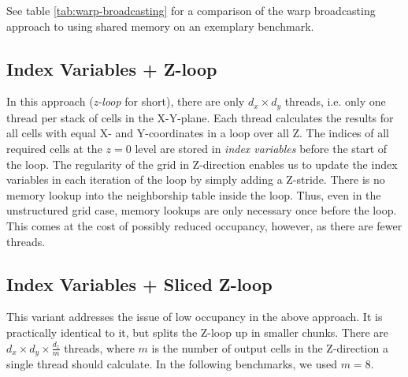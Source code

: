 See table \ref{tab:warp-broadcasting} for a comparison of the warp broadcasting approach to using shared memory on an exemplary benchmark.

\subsection{Index Variables + Z-loop} In this approach (\emph{z-loop} for short), there are only $d_x\times d_y$ threads, i.e. only one thread per stack of cells in the X-Y-plane. Each thread calculates the results for all cells with equal X- and Y-coordinates in a loop over all Z. The indices of all required cells at the $z=0$ level are stored in \emph{index variables} before the start of the loop. The regularity of the grid in Z-direction enables us to update the index variables in each iteration of the loop by simply adding a Z-stride. There is no memory lookup into the neighborship table inside the loop. Thus, even in the unstructured grid case, memory lookups are only necessary once before the loop. This comes at the cost of possibly reduced occupancy, however, as there are fewer threads.

\subsection{Index Variables + Sliced Z-loop} This variant addresses the issue of low occupancy in the above approach. It is practically identical to it, but splits the Z-loop up in smaller chunks. There are $d_x\times d_y\times \frac{d_z}{m}$ threads, where $m$ is the number of output cells in the Z-direction a single thread should calculate. In the following benchmarks, we used $m=8$.


